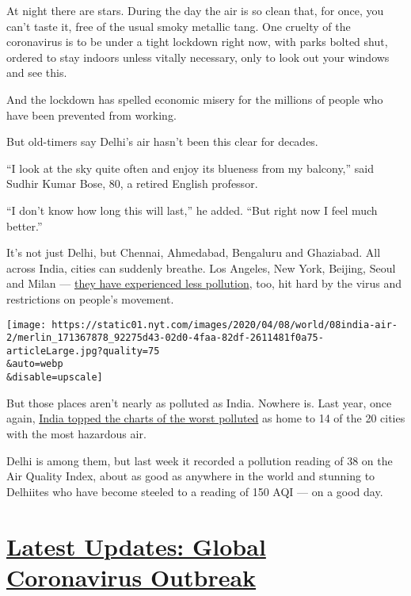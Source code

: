 At night there are stars. During the day the air is so clean that, for
once, you can't taste it, free of the usual smoky metallic tang. One
cruelty of the coronavirus is to be under a tight lockdown right now,
with parks bolted shut, ordered to stay indoors unless vitally
necessary, only to look out your windows and see this.

And the lockdown has spelled economic misery for the millions of people
who have been prevented from working.

But old-timers say Delhi's air hasn't been this clear for decades.

``I look at the sky quite often and enjoy its blueness from my
balcony,'' said Sudhir Kumar Bose, 80, a retired English professor.

``I don't know how long this will last,'' he added. ``But right now I
feel much better.''

It's not just Delhi, but Chennai, Ahmedabad, Bengaluru and Ghaziabad.
All across India, cities can suddenly breathe. Los Angeles, New York,
Beijing, Seoul and Milan ---
\href{https://www.nytimes.com/interactive/2020/climate/coronavirus-pollution.html}{they
have experienced less pollution}, too, hit hard by the virus and
restrictions on people's movement.

\texttt{[image: https://static01.nyt.com/images/2020/04/08/world/08india-air-2/merlin\_171367878\_92275d43-02d0-4faa-82df-2611481f0a75-articleLarge.jpg?quality=75\\\&auto=webp\\\&disable=upscale]}

But those places aren't nearly as polluted as India. Nowhere is. Last
year, once again,
\href{https://www.iqair.com/world-most-polluted-cities}{India topped the
charts of the worst polluted} as home to 14 of the 20 cities with the
most hazardous air.

Delhi is among them, but last week it recorded a pollution reading of 38
on the Air Quality Index, about as good as anywhere in the world and
stunning to Delhiites who have become steeled to a reading of 150 AQI
--- on a good day.

\hypertarget{latest-updates-global-coronavirus-outbreak}{%
\section{\texorpdfstring{\href{https://www.nytimes.com/2020/08/01/world/coronavirus-covid-19.html?action=click\&pgtype=Article\&state=default\&region=MAIN_CONTENT_1\&context=storylines_live_updates}{Latest
Updates: Global Coronavirus
Outbreak}}{Latest Updates: Global Coronavirus Outbreak}}\label{latest-updates-global-coronavirus-outbreak}}

